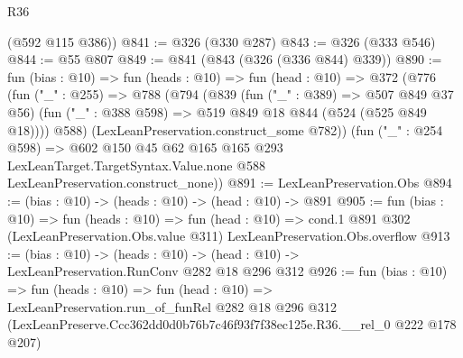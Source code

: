 \begin{lexlean}{R36}
\begin{coremodule}
      (@592 @115 @386))
@841 := @326 (@330 @287)
@843 := @326 (@333 @546)
@844 := @55 @807
@849 := @841 (@843 (@326 (@336 @844) @339))
@890 := fun (bias : @10) =>
  fun (heads : @10) =>
  fun (head : @10) =>
  @372
    (@776
      (fun ("_" : @255) =>
      @788
        (@794
          (@839
            (fun ("_" : @389) => @507 @849 @37 @56)
            (fun ("_" : @388 @598) => @519 @849 @18 @844 (@524 (@525 @849 @18))))
          @588)
        (LexLeanPreservation.construct_some @782))
      (fun ("_" : @254 @598) =>
      @602
        @150
        @45
        @62
        @165
        @165
        @293
        LexLeanTarget.TargetSyntax.Value.none
        @588
        LexLeanPreservation.construct_none))
@891 := LexLeanPreservation.Obs
@894 := (bias : @10) -> (heads : @10) -> (head : @10) -> @891
@905 := fun (bias : @10) =>
  fun (heads : @10) =>
  fun (head : @10) =>
  cond.{1} @891 @302 (LexLeanPreservation.Obs.value @311) LexLeanPreservation.Obs.overflow
@913 := (bias : @10) ->
  (heads : @10) -> (head : @10) -> LexLeanPreservation.RunConv @282 @18 @296 @312
@926 := fun (bias : @10) =>
  fun (heads : @10) =>
  fun (head : @10) =>
  LexLeanPreservation.run_of_funRel
    @282
    @18
    @296
    @312
    (LexLeanPreserve.Ccc362dd0d0b76b7c46f93f7f38ec125e.R36.__rel_0 @222 @178 @207)
\end{coremodule}
\end{lexlean}

